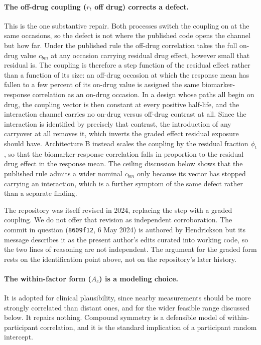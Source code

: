 \documentclass[
  11pt,
]{article}
\begin{document}
\paragraph{The off-drug coupling ($r_t$ off drug) corrects a
defect.}

This is the one substantive repair. Both processes switch the
coupling on at the same occasions, so the defect is not where the
published code opens the channel but how far. Under the published
rule the off-drug correlation takes the full on-drug value \(c_{bm}\)
at any occasion carrying residual drug effect, however small that
residual is. The coupling is therefore a step function of the residual
effect rather than a function of its size: an off-drug occasion at
which the response mean has fallen to a few percent of its on-drug
value is assigned the same biomarker-response correlation as an
on-drug occasion. In a design whose paths all begin on drug, the
coupling vector is then constant at every positive half-life, and the
interaction channel carries no on-drug versus off-drug contrast at
all. Since the interaction is identified by precisely that contrast,
the introduction of any carryover at all removes it, which inverts
the graded effect residual exposure should have. Architecture B
instead scales the coupling by the residual fraction \(\phi_t\), so that
the biomarker-response correlation falls in proportion to the residual
drug effect in the response mean. The ceiling discussion below shows
that the published rule admits a wider nominal \(c_{bm}\) only because
its vector has stopped carrying an interaction, which is a further
symptom of the same defect rather than a separate finding.

The repository was itself revised in 2024, replacing the step with a
graded coupling. We do not offer that revision as independent
corroboration. The commit in question (\texttt{8609f12}, 6 May 2024)
is authored by Hendrickson but its message describes it as the
present author's edits curated into working code, so the two lines of
reasoning are not independent. The argument for the graded form rests
on the identification point above, not on the repository's later
history.

\paragraph{The within-factor form ($A_c$) is a modeling choice.}

It
is adopted for clinical plausibility, since nearby measurements
should be more strongly correlated than distant ones, and for the
wider feasible range discussed below. It repairs nothing. Compound
symmetry is a defensible model of within-participant correlation, and
it is the standard implication of a participant random intercept.
\end{document}

